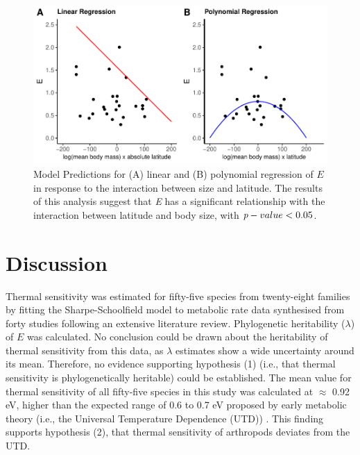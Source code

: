 \documentclass[11pt]{article}
\begin{document}
\begin{flushleft}
\begin{figure}[!htbp]
    \centering
    \includegraphics[width=5in]{compare_ls_grid.pdf}
    \caption{\label{fig:7} Model Predictions for (A) linear and (B) polynomial regression of \emph{$E$} in response to the interaction between size and latitude. The results of this analysis suggest that \emph{E} has a significant relationship with the interaction between latitude and body size, with $\emph{p}-value < 0.05$.}
\end{figure}
\clearpage

\section{Discussion}
Thermal sensitivity was estimated for fifty-five species from twenty-eight families by fitting the Sharpe-Schoolfield model to metabolic rate data synthesised from forty studies following an extensive literature review. Phylogenetic heritability ($\lambda$) of $E$ was calculated. No conclusion could be drawn about the heritability of thermal sensitivity from this data, as $\lambda$ estimates show a wide uncertainty around its mean. Therefore, no evidence supporting hypothesis (1) (i.e., that thermal sensitivity is phylogenetically heritable) could be established. The mean value for thermal sensitivity of all fifty-five species in this study was calculated at $\approx$ 0.92 eV, higher than the expected range of 0.6 to 0.7 eV proposed by early metabolic theory (i.e., the Universal Temperature Dependence (UTD)) \citep{gillooly2001effects}.  This finding supports hypothesis (2), that thermal sensitivity of arthropods deviates from the UTD. 
\linebreak


\end{flushleft}
\end{document}
